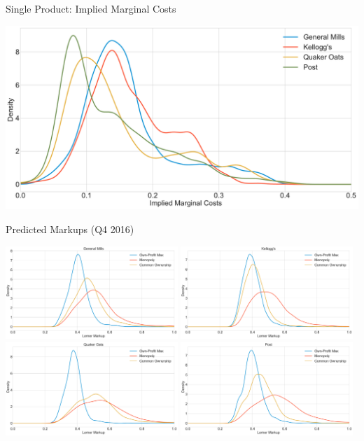 \begin{frame}[plain]{Single Product: Implied Marginal Costs}
\begin{center}
\includegraphics[height =0.8\textheight]{../common ownership/figures/mu_all_bertrand_real.pdf}
\end{center}
\end{frame}



\begin{frame}[plain]{Predicted Markups (Q4 2016)}
\begin{center}
\includegraphics[width = 6.5cm]{../common ownership/figures/mu_gm_real.pdf}
\includegraphics[width = 6.5cm]{../common ownership/figures/mu_kel_real.pdf}\\
\includegraphics[width = 6.5cm]{../common ownership/figures/mu_qkr_real.pdf}
\includegraphics[width = 6.5cm]{../common ownership/figures/mu_post_real.pdf}
\end{center}
\end{frame}


